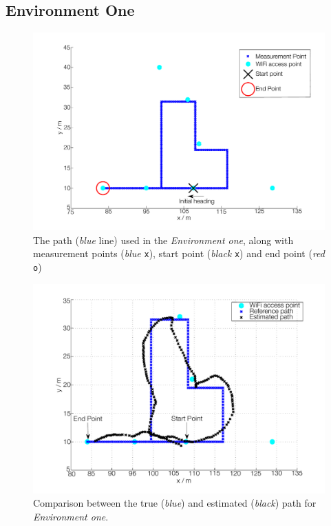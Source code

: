 \documentclass{LTHthesis}
\begin{document}
\subsection{Environment One} 
%

%
\begin{figure}[!hbt]

\includegraphics[width=1\textwidth ]{images/pure_rssi/env_one}
\caption{The path (\emph{blue} line) used in the \emph{Environment one}, along with measurement points (\emph{blue} \texttt{x}), start point (\emph{black} \texttt{x}) and end point (\emph{red} \texttt{o}) }\label{env_one}
\end{figure}
%
\begin{figure}[!hbt]

\includegraphics[width=1\textwidth ]{images/pure_rssi/true_vs_est_env_1_05}
\caption{Comparison between the true (\emph{blue}) and estimated (\emph{black}) path for \emph{Environment one}.}\label{true_vs_est_env_1_05}
\end{figure}
\end{document}
